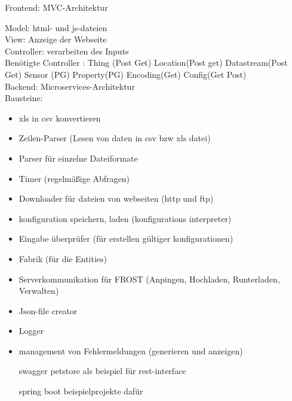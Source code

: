 Frontend: MVC-Architektur

Model: html- und js-dateien\\
View: Anzeige der Webseite\\
Controller: verarbeiten des Inputs\\
Benötigte Controller : Thing (Post Get) Location(Post get) Datastream(Post Get) Sensor (PG) Property(PG) Encoding(Get) Config(Get Post)\\
Backend: Microservices-Architektur
\ \\

Bausteine:
\begin{itemize}
\item xls in csv konvertieren
\item Zeilen-Parser (Lesen von daten in csv bzw xls datei)
\item Parser für einzelne Dateiformate
\item Timer (regelmäßige Abfragen)
\item Downloader für dateien von webseiten (http und ftp)
\item konfiguration speichern, laden (konfigurations interpreter)
\item Eingabe überprüfer (für erstellen gültiger konfigurationen)
\item Fabrik (für die Entities)
\item Serverkommunikation für FROST (Anpingen, Hochladen, Runterladen, Verwalten)
\item Json-file creator
\item Logger
\item management von Fehlermeldungen (generieren und anzeigen)


swagger petstore als beispiel für rest-interface

spring boot beispielprojekte dafür


\end{itemize}